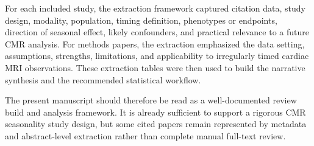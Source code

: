 For each included study, the extraction framework captured citation data, study design, modality, population, timing definition, phenotypes or endpoints, direction of seasonal effect, likely confounders, and practical relevance to a future CMR analysis. For methods papers, the extraction emphasized the data setting, assumptions, strengths, limitations, and applicability to irregularly timed cardiac MRI observations. These extraction tables were then used to build the narrative synthesis and the recommended statistical workflow.

The present manuscript should therefore be read as a well-documented review build and analysis framework. It is already sufficient to support a rigorous CMR seasonality study design, but some cited papers remain represented by metadata and abstract-level extraction rather than complete manual full-text review.
